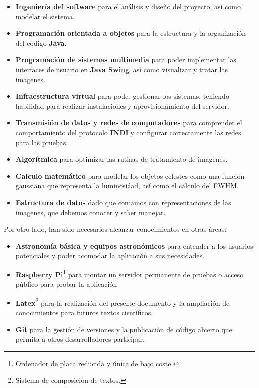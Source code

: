\begin{itemize}
  \item \textbf{Ingeniería del software} para el análisis y diseño del proyecto, así como modelar el sistema.
  \item \textbf{Programación orientada a objetos} para la estructura y la organización del código \textbf{Java}.
  \item \textbf{Programación de sistemas multimedia} para poder implementar las interfaces de usuario en \textbf{Java Swing}, así como visualizar y tratar las imagenes.
  \item \textbf{Infraestructura virtual} para poder gestionar los sistemas, teniendo habilidad para realizar instalaciones y aprovisionamiento del servidor.
  \item \textbf{Transmisión de datos y redes de computadores} para comprender el comportamiento del protocolo \textbf{INDI} y configurar correctamente las redes para las pruebas.
  \item \textbf{Algorítmica} para optimizar las rutinas de tratamiento de imagenes.
  \item \textbf{Calculo matemático} para modelar los objetos celestes como una función gaussiana que representa la luminosidad, así como el calculo del FWHM.
  \item \textbf{Estructura de datos} dado que contamos con representaciones de las imagenes, que debemos conocer y saber manejar.


\end{itemize}

\bigskip
Por otro lado, han sido necesarios alcanzar conocimientos en otras áreas:

\begin{itemize}

  \item \textbf{Astronomía básica y equipos astronómicos} para entender a los usuarios potenciales y poder acomodar la aplicación a sus necesidades.
  \item \textbf{Raspberry Pi}\footnote{Ordenador de placa reducida y única de bajo coste.} para montar un servidor permanente de pruebas o acceso público para probar la aplicación
  \item \textbf{Latex}\footnote{Sistema de composición de textos.} para la realización del presente documento y la ampliación de conocimientos para futuros textos científicos.
  \item \textbf{Git} para la gestión de versiones y la publicación de código abierto que permita a otros desarrolladores participar.
\end{itemize}
